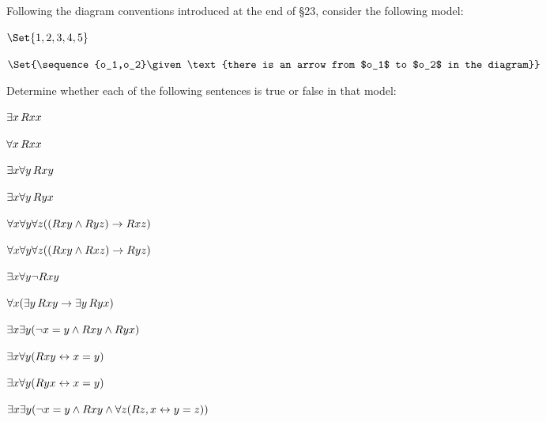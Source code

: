 \begin{practiceproblems}
	\problempart
	\label{pr:TorF3}
	Following the diagram conventions introduced at the end of \S23, consider the following model:	
	\begin{interp}
		\item[\domain] $\Set{1,2,3,4,5}$
		\item[\denote{R}] $\Set{\sequence{o_1,o_2}\given\text{there is an arrow from $o_1$ to $o_2$ in the diagram}}$
	\end{interp}
	\begin{center}
	\end{center}
	Determine whether each of the following sentences is true or false in that model:
	\begin{problemslist}
		\item $\exists x\,\mathord{R}x x$ \hfill {}
		\item $\forall x\,\mathord{R}x x$ \hfill {}
		\item $\exists x \forall y\,\mathord{R}x y$ \hfill {}
		\item $\exists x \forall y\,\mathord{R}y x$ \hfill {}
		\item $\forall x \forall y \forall z ((\mathord{R}x y \mathbin{\wedge} \mathord{R}y z) \rightarrow \mathord{R}x z)$ \hfill {}
		\item $\forall x \forall y \forall z ((\mathord{R}x y \mathbin{\wedge} \mathord{R}x z) \rightarrow \mathord{R}y z)$ \hfill {}
		\item $\exists x \forall y \neg \mathord{R}x y$ \hfill {}
		\item $\forall x(\exists y\,\mathord{R}x y \rightarrow \exists y\,\mathord{R}y x)$ \hfill {}
		\item $\exists x \exists y (\neg x = y \mathbin{\wedge} \mathord{R}x y \mathbin{\wedge} \mathord{R}y x)$ \hfill {}
		\item $\exists x \forall y(\mathord{R}x y \leftrightarrow x = y)$ \hfill {}
		\item $\exists x \forall y(\mathord{R}y x \leftrightarrow x = y)$ \hfill {}
		\item $\exists x \exists y(\neg x = y \mathbin{\wedge} \mathord{R}x y \mathbin{\wedge} \forall z(\mathord{R}z,x \leftrightarrow y = z))$ \hfill {}
	\end{problemslist}
\end{practiceproblems}




